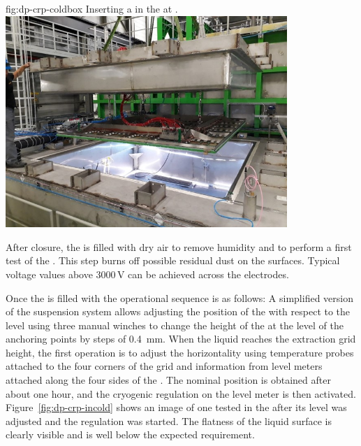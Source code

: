  \begin{dunefigure}
{fig:dp-crp-coldbox}
{Inserting a   in the \coldbox at .}
\includegraphics[width=0.8\textwidth]{graphics/CRP-coldbox}
\end{dunefigure}

After closure, the \coldbox is filled with dry air to remove humidity and to perform a first  test of the . This step burns off possible residual dust on the  surfaces. Typical voltage values above 3000\,V can be achieved across the  electrodes.

Once the \coldbox is filled with  the operational sequence is as follows:
A simplified version of the suspension system allows adjusting the position of the  with respect to the  level using three manual winches to change the height of the  at the level of the anchoring points by steps of \SI{0.4}{mm}.
When the liquid reaches the extraction grid height, the first operation is to adjust the horizontality using temperature probes attached to  the four corners of the grid and information from level meters attached along the four sides of the . The nominal position is obtained after about one hour, and the cryogenic regulation on the  level meter is then activated. Figure~\ref{fig:dp-crp-incold} shows an image of one   tested in the \coldbox after its level was adjusted and the regulation was started. The flatness of the liquid surface is clearly visible and is well below the expected \coldbox requirement.

